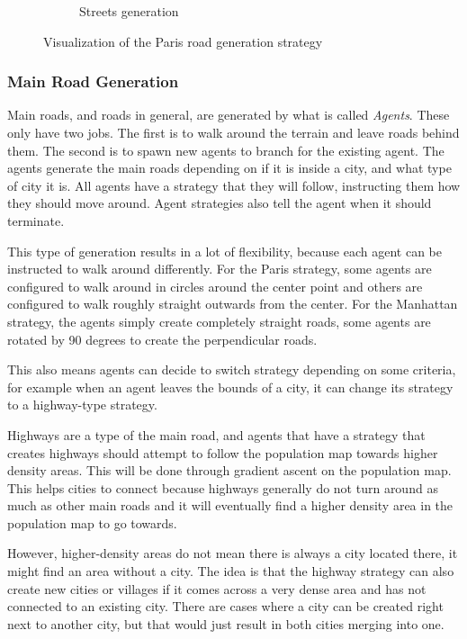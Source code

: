 \begin{center}
\begin{figure}[H]
\begin{subfigure}[b]{0.49\textwidth}
      \caption{Streets generation}
      \label{fig:gen_road_paris_streets}
    \end{subfigure}
    \caption{Visualization of the Paris road generation strategy}
    \label{fig:gen_road_paris_visualization}
  \end{figure}
\end{center}

\subsubsection{Main Road Generation}
Main roads, and roads in general, are generated by what is called \textit{Agents}.
These only have two jobs.
The first is to walk around the terrain and leave roads behind them.
The second is to spawn new agents to branch for the existing agent.
The agents generate the main roads depending on if it is inside a city, and what type of city it is.
All agents have a strategy that they will follow, instructing them how they should move around.
Agent strategies also tell the agent when it should terminate.

This type of generation results in a lot of flexibility, because each agent can be instructed to walk around differently.
For the Paris strategy, some agents are configured to walk around in circles around the center point and others are configured to walk roughly straight outwards from the center.
For the Manhattan strategy, the agents simply create completely straight roads, some agents are rotated by 90 degrees to create the perpendicular roads.

This also means agents can decide to switch strategy depending on some criteria, for example when an agent leaves the bounds of a city, it can change its strategy to a highway-type strategy.

Highways are a type of the main road, and agents that have a strategy that creates highways should attempt to follow the population map towards higher density areas.
This will be done through gradient ascent on the population map.
This helps cities to connect because highways generally do not turn around as much as other main roads and it will eventually find a higher density area in the population map to go towards.

However, higher-density areas do not mean there is always a city located there, it might find an area without a city.
The idea is that the highway strategy can also create new cities or villages if it comes across a very dense area and has not connected to an existing city.
There are cases where a city can be created right next to another city, but that would just result in both cities merging into one.

